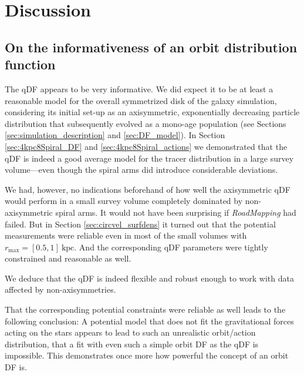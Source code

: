 \documentclass[iop,revtex4,numberedappendix,appendixfloats]{emulateapj}
\newcommand{\RM}{{\sl RoadMapping}}
\begin{document}
\section{Discussion} \label{sec:discussion}

\subsection{On the informativeness of an orbit distribution function}

The qDF appears to be very informative. We did expect it to be at least a reasonable model for the overall symmetrized disk of the galaxy simulation, considering its initial set-up as an axisymmetric, exponentially decreasing particle distribution that subsequently evolved as a mono-age population (see Sections \ref{sec:simulation_description} and \ref{sec:DF_model}). In Section \ref{sec:4kpc8Spiral_DF} and \ref{sec:4kpc8Spiral_actions} we demonstrated that the qDF is indeed a good average model for the tracer distribution in a large survey volume---even though the spiral arms did introduce considerable deviations.

We had, however, no indications beforehand of how well the axisymmetric qDF would perform in a small survey volume completely dominated by non-axisymmetric spiral arms. It would not have been surprising if \RM{} had failed. But in Section \ref{sec:circvel_surfdens} it turned out that the potential measurements were reliable even in most of the small volumes with $r_\text{max}=[0.5,1]~\text{kpc}$. And the corresponding qDF parameters were tightly constrained and reasonable as well. 

We deduce that the qDF is indeed flexible and robust enough to work with data affected by non-axisymmetries.

That the corresponding potential constraints were reliable as well leads to the following conclusion: A potential model that does not fit the gravitational forces acting on the stars appears to lead to such an unrealistic orbit/action distribution, that a fit with even such a simple orbit DF as the qDF is impossible. This demonstrates once more how powerful the concept of an orbit DF is.
\end{document}
